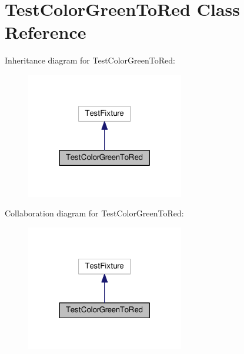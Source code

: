 \hypertarget{class_test_color_green_to_red}{}\section{Test\+Color\+Green\+To\+Red Class Reference}
\label{class_test_color_green_to_red}


Inheritance diagram for Test\+Color\+Green\+To\+Red\+:
\nopagebreak
\begin{figure}[H]
\begin{center}
\leavevmode
\includegraphics[width=195pt]{class_test_color_green_to_red__inherit__graph}
\end{center}
\end{figure}


Collaboration diagram for Test\+Color\+Green\+To\+Red\+:
\nopagebreak
\begin{figure}[H]
\begin{center}
\leavevmode
\includegraphics[width=195pt]{class_test_color_green_to_red__coll__graph}
\end{center}
\end{figure}
